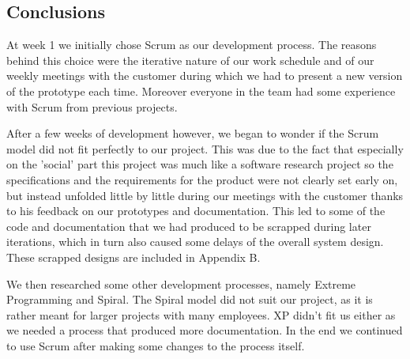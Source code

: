 \subsection{Conclusions}
At week 1 we initially chose Scrum as our development process. The reasons behind this choice were the iterative nature
of our work schedule and of our weekly meetings with the customer during which we had to present a new version
of the prototype each time. Moreover everyone in the team had some experience with Scrum from previous projects.

After a few weeks of development however, we began to wonder if the Scrum model did not fit perfectly to our project.
This was due to the fact that especially on the 'social' part this project was much like a software research project
so the specifications and the requirements for the product were not clearly set early on, but instead unfolded little
by little during our meetings with the customer thanks to his feedback on our prototypes and documentation.
This led to some of the code and documentation that we had produced to be scrapped during later iterations, 
which in turn also caused some delays of the overall system design. These scrapped designs are included in Appendix B.

We then researched some other development processes, namely Extreme Programming and Spiral. The Spiral model 
did not suit our project, as it is rather meant for larger projects with many employees. XP didn't fit us either as we needed 
a process that produced more documentation. In the end we continued to use Scrum after making some changes to the 
process itself.

